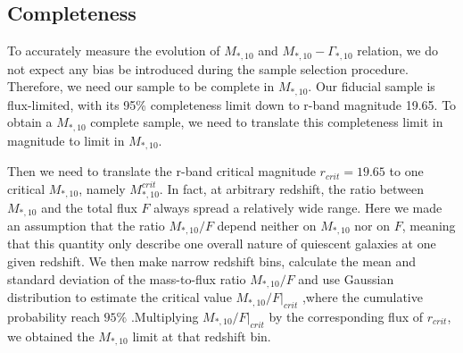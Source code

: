 \documentclass[fleqn,usenatbib]{mnras}
\begin{document}
\subsection{Completeness}
To accurately measure the evolution of $M_{*,10}$ and $M_{*,10} - \Gamma_{*,10} $ relation, we do not expect any bias be introduced during the sample selection procedure. Therefore, we need our sample to be complete in $M_{*,10}$. Our fiducial sample is flux-limited, with its 95\% completeness limit down to r-band magnitude 19.65. To obtain a $M_{*,10}$ complete sample, we need to translate this completeness limit in magnitude to limit in $M_{*,10}$.
\par Then we need to translate the r-band critical magnitude $r_{crit} = 19.65$ to one critical $M_{*,10}$, namely $M_{*,10}^{crit}$. In fact, at arbitrary redshift, the ratio between $M_{*,10}$ and the total flux $F$ always spread a relatively wide range. Here we made an assumption that the ratio $M_{*,10} / F$ depend neither on $M_{*,10} $ nor on $F$, meaning that this quantity only describe one overall nature of quiescent galaxies at one given redshift. We then make narrow redshift bins, calculate the mean and standard deviation of the mass-to-flux ratio $M_{*,10} / F$ and use Gaussian distribution to estimate the critical value $M_{*,10} / F|_{crit}$ ,where the cumulative probability reach $95\%$ .Multiplying $M_{*,10} / F|_{crit}$ by the corresponding flux of $r_{crit}$, we obtained the $M_{*,10}$ limit at that redshift bin. 
\end{document}
